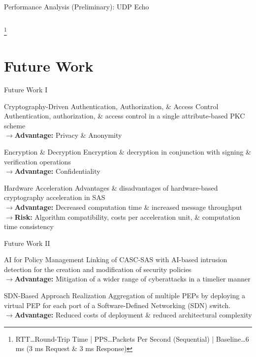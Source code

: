 \documentclass[en]{sdqbeamer}
\newcommand\nonumberfootnote[1]{%
  \begingroup
  \renewcommand\thefootnote{}\footnote{#1}%
  \addtocounter{footnote}{-1}%
  \endgroup
}
\begin{document}
\begin{frame}{Performance Analysis (Preliminary): UDP Echo}
\begin{columns}
    \end{columns}
    \nonumberfootnote{RTT\dots Round-Trip Time | PPS\dots Packets Per Second (Sequential) | Baseline\dots 6 ms (3 ms Request \& 3 ms Response)}
\end{frame}

\section{Future Work}
\begin{frame}{Future Work I}
    \begin{blueblock}{Cryptography-Driven Authentication, Authorization, \& Access Control}
        Authentication, authorization, \& access control in a single attribute-based PKC scheme
        \\$\rightarrow$\textbf{Advantage:} Privacy \& Anonymity
    \end{blueblock}
    \begin{blueblock}{Encryption \& Decryption}
        Encryption \& decryption in conjunction with signing \& verification operations
        \\$\rightarrow$\textbf{Advantage:} Confidentiality
    \end{blueblock}
    \begin{blueblock}{Hardware Acceleration}
        Advantages \& disadvantages of hardware-based cryptography acceleration in SAS
        \\$\rightarrow$\textbf{Advantage:} Decreased computation time \& increased message throughput
        \\$\rightarrow$\textbf{Risk:} Algorithm compatibility, costs per acceleration unit, \& computation time consistency
    \end{blueblock}
\end{frame}
\begin{frame}{Future Work II}
    \begin{blueblock}{AI for Policy Management}
        Linking of CASC-SAS with AI-based intrusion detection for the creation and modification of security policies
        \\$\rightarrow$\textbf{Advantage:} Mitigation of a wider range of cyberattacks in a timelier manner
    \end{blueblock}
    \begin{blueblock}{SDN-Based Approach Realization}
        Aggregation of multiple PEPs by deploying a virtual PEP for each port of a Software-Defined Networking (SDN) switch.
        \\$\rightarrow$\textbf{Advantage:} Reduced costs of deployment \& reduced architectural complexity
    \end{blueblock}
\end{frame}
\end{document}
